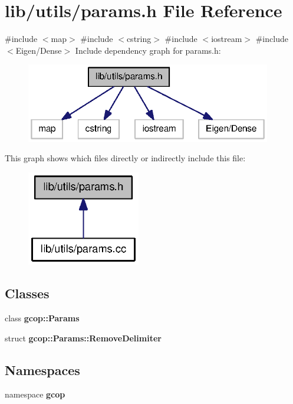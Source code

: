 \section{lib/utils/params.h \-File \-Reference}
\label{params_8h}
{\ttfamily \#include $<$map$>$}\*
{\ttfamily \#include $<$cstring$>$}\*
{\ttfamily \#include $<$iostream$>$}\*
{\ttfamily \#include $<$\-Eigen/\-Dense$>$}\*
\-Include dependency graph for params.\-h\-:
\nopagebreak
\begin{figure}[H]
\begin{center}
\leavevmode
\includegraphics[width=304pt]{params_8h__incl}
\end{center}
\end{figure}
\-This graph shows which files directly or indirectly include this file\-:
\nopagebreak
\begin{figure}[H]
\begin{center}
\leavevmode
\includegraphics[width=140pt]{params_8h__dep__incl}
\end{center}
\end{figure}
\subsection*{\-Classes}
\begin{DoxyCompactItemize}
\item 
class {\bf gcop\-::\-Params}
\item 
struct {\bf gcop\-::\-Params\-::\-Remove\-Delimiter}
\end{DoxyCompactItemize}
\subsection*{\-Namespaces}
\begin{DoxyCompactItemize}
\item 
namespace {\bf gcop}
\end{DoxyCompactItemize}
